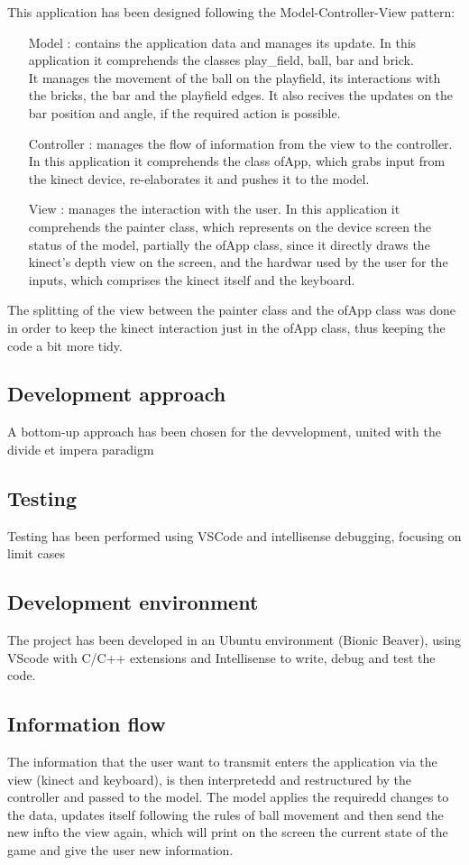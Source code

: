 \documentclass[]{article}
\begin{document}
\newpage
This application has been designed following the Model-Controller-View pattern:
\begin{itemize}
	\item [Model]: contains the application data and manages its update. In this application it comprehends the classes play\_field, ball, bar and brick.\\
				It manages the movement of the ball on the playfield, its interactions with the bricks, the bar and the playfield edges. It also recives the updates on the bar position and angle, if the required action is possible. 
	\item [Controller]: manages the flow of information from the view to the controller. In this application it comprehends the class ofApp, which grabs input from the kinect device, re-elaborates it and pushes it to the model.
	\item [View]: manages the interaction with the user. In this application it comprehends the painter class, which represents on the device screen the status of the model, partially the ofApp class, since it directly draws the kinect's depth view on the screen, and the hardwar used by the user for the inputs, which comprises the kinect itself and the keyboard. 
\end{itemize}
The splitting of the view between the painter class and the ofApp class was done in order to keep the kinect interaction just in the ofApp class, thus keeping the code a bit more tidy.
\subsection{Development approach}
A bottom-up approach has been chosen for the devvelopment, united with the divide et impera paradigm
\subsection{Testing}
Testing has been performed using VSCode and intellisense debugging, focusing on limit cases 
\subsection{Development environment}
The project has been developed in an Ubuntu environment (Bionic Beaver), using VScode with C/C++ extensions and Intellisense to write, debug and test the code. 
\subsection{Information flow}
The information that the user want to transmit enters the application via the view (kinect and keyboard), is then interpretedd and restructured by the controller and passed to the model. The model applies the requiredd changes to the data, updates itself following the rules of ball movement and then send the new infto the view again, which will print on the screen the current state of the game and give the user new information.\\
\end{document}
